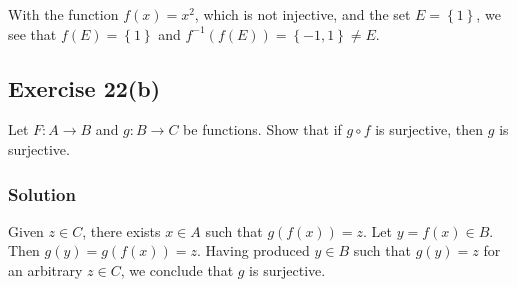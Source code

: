 \documentclass[12pt]{article}
\begin{document}
With the function $f(x) = x^2$, which is not injective, and the set $E = \left\{1\right\}$, we see that $f(E) = \left\{1\right\}$ and $f^{-1}(f(E)) = \left\{-1, 1\right\} \neq E$.

\subsection*{Exercise 22(b)}
Let $F : A \to B$ and $g : B \to C$ be functions. Show that if $g \circ f$ is surjective, then $g$ is surjective.
\subsubsection*{Solution}
Given $z \in C$, there exists $x \in A$ such that $g(f(x)) = z$. Let $y = f(x) \in B$. Then $g(y) = g(f(x)) = z$. Having produced $y \in B$ such that $g(y) = z$ for an arbitrary $z \in C$, we conclude that $g$ is surjective.

\end{document}
